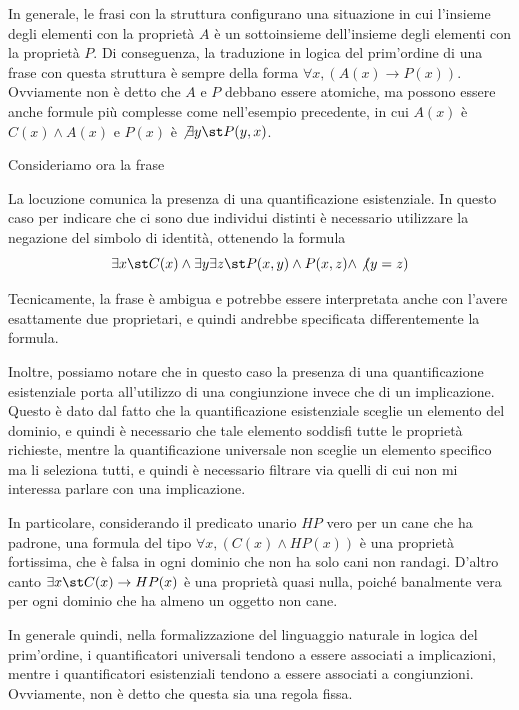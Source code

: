 In generale, le frasi con la struttura  configurano una situazione in cui l'insieme degli elementi con la proprietà \(A\) è un sottoinsieme dell'insieme degli elementi con la proprietà \(P\). Di conseguenza, la traduzione in logica del prim'ordine di una frase con questa struttura è sempre della forma \(\forall x, (A(x) \to P(x))\).
Ovviamente non è detto che \(A\) e \(P\) debbano essere atomiche, ma possono essere anche formule più complesse come nell'esempio precedente, in cui \(A(x)\) è \(C(x)\land A(x)\) e \(P(x)\) è \(\not\exists y\st P(y,x)\).

Consideriamo ora la frase 
\begin{quote}
\end{quote}

La locuzione  comunica la presenza di una quantificazione esistenziale. In questo caso per indicare che ci sono due individui distinti è necessario utilizzare la negazione del simbolo di identità, ottenendo la formula
\[\exists x\st C(x) \land \exists y \exists z\st P(x,y) \land P(x,z) \land \not(y = z)\]

Tecnicamente, la frase è ambigua e potrebbe essere interpretata anche con l'avere esattamente due proprietari, e quindi andrebbe specificata differentemente la formula.

Inoltre, possiamo notare che in questo caso la presenza di una quantificazione esistenziale porta all'utilizzo di una congiunzione invece che di un implicazione. Questo è dato dal fatto che la quantificazione esistenziale sceglie un elemento del dominio, e quindi è necessario che tale elemento soddisfi tutte le proprietà richieste, mentre la quantificazione universale non sceglie un elemento specifico ma li seleziona tutti, e quindi è necessario filtrare via quelli di cui non mi interessa parlare con una implicazione.

In particolare, considerando il predicato unario \(HP\) vero per un cane che ha padrone, una formula del tipo \(\forall x, (C(x) \land HP(x))\) è una proprietà fortissima, che è falsa in ogni dominio che non ha solo cani non randagi. D'altro canto \(\exists x\st C(x) \to HP(x)\) è una proprietà quasi nulla, poiché banalmente vera per ogni dominio che ha almeno un oggetto non cane.

In generale quindi, nella formalizzazione del linguaggio naturale in logica del prim'ordine, i quantificatori universali tendono a essere associati a implicazioni, mentre i quantificatori esistenziali tendono a essere associati a congiunzioni. Ovviamente, non è detto che questa sia una regola fissa.

